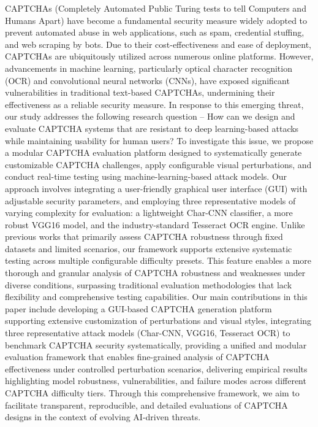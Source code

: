 \documentclass[
  a4paper,
  oneside,         %
  UKenglish,       %
  cleveref,        %
  autoref,         %
  thm-restate      %
]{lipics-v2021}
\begin{document}
CAPTCHAs (Completely Automated Public Turing tests to tell Computers and Humans Apart) have become a fundamental security measure widely adopted to prevent automated abuse in web applications, such as spam, credential stuffing, and web scraping by bots. Due to their cost-effectiveness and ease of deployment, CAPTCHAs are ubiquitously utilized across numerous online platforms. However, advancements in machine learning, particularly optical character recognition (OCR) and convolutional neural networks (CNNs), have exposed significant vulnerabilities in traditional text-based CAPTCHAs, undermining their effectiveness as a reliable security measure. In response to this emerging threat, our study addresses the following research question -- How can we design and evaluate CAPTCHA systems that are resistant to deep learning-based attacks while maintaining usability for human users? To investigate this issue, we propose a modular CAPTCHA evaluation platform designed to systematically generate customizable CAPTCHA challenges, apply configurable visual perturbations, and conduct real-time testing using machine-learning-based attack models. Our approach involves integrating a user-friendly graphical user interface (GUI) with adjustable security parameters, and employing three representative models of varying complexity for evaluation: a lightweight Char-CNN classifier, a more robust VGG16 model, and the industry-standard Tesseract OCR engine. Unlike previous works that primarily assess CAPTCHA robustness through fixed datasets and limited scenarios, our framework supports extensive systematic testing across multiple configurable difficulty presets. This feature enables a more thorough and granular analysis of CAPTCHA robustness and weaknesses under diverse conditions, surpassing traditional evaluation methodologies that lack flexibility and comprehensive testing capabilities. Our main contributions in this paper include developing a GUI-based CAPTCHA generation platform supporting extensive customization of perturbations and visual styles, integrating three representative attack models (Char-CNN, VGG16, Tesseract OCR) to benchmark CAPTCHA security systematically, providing a unified and modular evaluation framework that enables fine-grained analysis of CAPTCHA effectiveness under controlled perturbation scenarios, delivering empirical results highlighting model robustness, vulnerabilities, and failure modes across different CAPTCHA difficulty tiers. Through this comprehensive framework, we aim to facilitate transparent, reproducible, and detailed evaluations of CAPTCHA designs in the context of evolving AI-driven threats.
\end{document}
